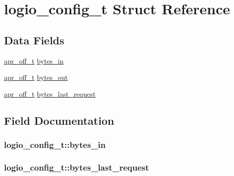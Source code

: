 \hypertarget{structlogio__config__t}{}\section{logio\+\_\+config\+\_\+t Struct Reference}
\label{structlogio__config__t}
\subsection*{Data Fields}
\begin{DoxyCompactItemize}
\item 
\hyperlink{group__apr__platform_ga6938af9075cec15c88299109381aa984}{apr\+\_\+off\+\_\+t} \hyperlink{structlogio__config__t_a86921ba27bbd456e2a1a0f30c40ee183}{bytes\+\_\+in}
\item 
\hyperlink{group__apr__platform_ga6938af9075cec15c88299109381aa984}{apr\+\_\+off\+\_\+t} \hyperlink{structlogio__config__t_afdd34457f170abdc381a7b1a473f25f9}{bytes\+\_\+out}
\item 
\hyperlink{group__apr__platform_ga6938af9075cec15c88299109381aa984}{apr\+\_\+off\+\_\+t} \hyperlink{structlogio__config__t_add2dfb1a36759190bd403a92d83ecc74}{bytes\+\_\+last\+\_\+request}
\end{DoxyCompactItemize}


\subsection{Field Documentation}
\subsubsection[{\texorpdfstring{bytes\+\_\+in}{bytes_in}}]{ logio\+\_\+config\+\_\+t\+::bytes\+\_\+in}\hypertarget{structlogio__config__t_a86921ba27bbd456e2a1a0f30c40ee183}{}\label{structlogio__config__t_a86921ba27bbd456e2a1a0f30c40ee183}
\subsubsection[{\texorpdfstring{bytes\+\_\+last\+\_\+request}{bytes_last_request}}]{ logio\+\_\+config\+\_\+t\+::bytes\+\_\+last\+\_\+request}\hypertarget{structlogio__config__t_add2dfb1a36759190bd403a92d83ecc74}{}\label{structlogio__config__t_add2dfb1a36759190bd403a92d83ecc74}
